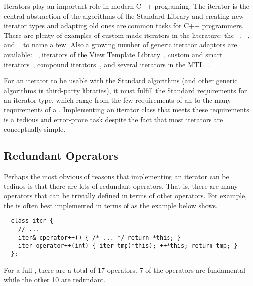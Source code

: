 \documentclass{netobjectdays}
\begin{document}
Iterators play an important role in modern C++ programing. The
iterator is the central abstraction of the algorithms of the Standard
Library and creating new iterator types and adapting old ones are
common tasks for C++ programmers. There are plenty of examples of
custom-made iterators in the literature: the
~\cite{austern99:_gener_progr_stl},
~\cite{koenig97:_rumin_cpp}, 
 and
~\cite{iso98:_cpp_final_draft_standard} to
name a few. Also a growing number of generic iterator adaptors are
available: ~\cite{stroustrup00:_cpp_prog_lang},
iterators of the View Template Library~\cite{TMPW00:Weiser}, custom
and smart iterators~\cite{becker98:_smart_iteraters,TMPW00:Baus},
compound iterators~\cite{alexandrescu98:_compound_iters}, and several
iterators in the MTL~\cite{siek99:_scitools}.

For an iterator to be usable with the Standard algorithms (and other
generic algorithms in third-party libraries), it must fulfill the
Standard requirements for an iterator type, which range from the few
requirements of an  to the many requirements
of a . Implementing an iterator class
that meets these requirements is a tedious and error-prone task
despite the fact that most iterators are conceptually simple.

\subsection{Redundant Operators}

Perhaps the most obvious of reasons that implementing an iterator can
be tediuos is that there are lots of redundant operators.  That is,
there are many operators that can be trivially defined in terms of
other operators. For example, the  is often best
implemented in terms of  as the example below
shows.

{\footnotesize
\begin{verbatim}
  class iter {
    // ...
    iter& operator++() { /* ... */ return *this; }
    iter operator++(int) { iter tmp(*this); ++*this; return tmp; }
  };
\end{verbatim}
}

For a full , there are a total of 17
operators. 7 of the operators are fundamental while the other 10 are
redundant.

 
\end{document}
